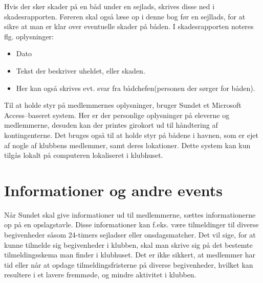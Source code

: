 Hvis der sker skader på en båd under en sejlads, skrives disse ned i skadesrapporten. 
Føreren skal også læse op i denne bog før en sejllads, for at sikre at man er klar over eventuelle skader på båden.
I skadesrapporten noteres flg. oplysninger:

\begin{itemize}
	\item Dato
	\item Tekst der beskriver uheldet, eller skaden.
	\item Her kan også skrives evt. svar fra bådchefen(personen der sørger for båden).
\end{itemize}

Til at holde styr på medlemmernes oplysninger, bruger Sundet et Microsoft Access--baseret system. Her er der personlige oplysninger på eleverne og medlemmerne, desuden kan der printes girokort ud til håndtering af kontingenterne. Det bruges også til at holde styr på bådene i havnen, som er ejet af nogle af klubbens medlemmer, samt deres lokationer. Dette system kan kun tilgås lokalt på computeren lokaliseret i klubhuset.

\section{Informationer og andre events}

Når Sundet skal give informationer ud til medlemmerne, sættes informationerne op på en opslagstavle.
Disse informationer kan f.eks. være tilmeldinger til diverse begivenheder såsom 24-timers sejladser eller onsdagsmatcher. 
Det vil sige, for at kunne tilmelde sig begivenheder i klubben, skal man skrive sig på det bestemte tilmeldingsskema man finder i klubhuset. 
Det er ikke sikkert, at medlemmer har tid eller når at opdage tilmeldingsfristerne på diverse begivenheder, hvilket kan resultere i et lavere fremmøde, og mindre aktivitet i klubben.

